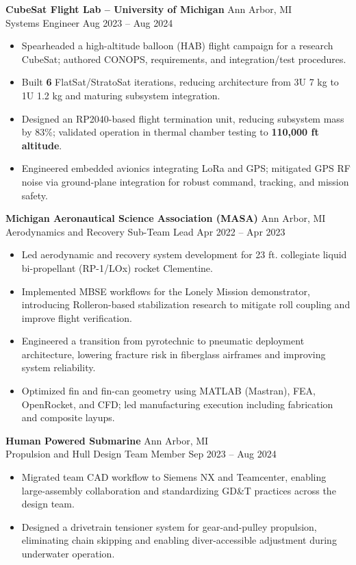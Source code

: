 \documentclass[10pt]{article}
\begin{document}
{\bfseries CubeSat Flight Lab -- University of Michigan} \hfill Ann Arbor, MI \\
Systems Engineer \hfill Aug 2023 -- Aug 2024
\begin{itemize}
  \item Spearheaded a high-altitude balloon (HAB) flight campaign for a research CubeSat; authored CONOPS, requirements, and integration/test procedures.
  \item Built {\bfseries 6} FlatSat/StratoSat iterations, reducing architecture from 3U 7 kg to 1U 1.2 kg and maturing subsystem integration.
  \item Designed an RP2040-based flight termination unit, reducing subsystem mass by 83\%; validated operation in thermal chamber testing to {\bfseries 110,000 ft altitude}.
  \item Engineered embedded avionics integrating LoRa and GPS; mitigated GPS RF noise via ground-plane integration for robust command, tracking, and mission safety.
\end{itemize}

{\bfseries Michigan Aeronautical Science Association (MASA)} \hfill Ann Arbor, MI \\
Aerodynamics and Recovery Sub-Team Lead \hfill Apr 2022 -- Apr 2023
\begin{itemize}
  \item Led aerodynamic and recovery system development for 23 ft. collegiate liquid bi-propellant (RP-1/LOx) rocket Clementine.
  \item Implemented MBSE workflows for the Lonely Mission demonstrator, introducing Rolleron-based stabilization research to mitigate roll coupling and improve flight verification.
  \item Engineered a transition from pyrotechnic to pneumatic deployment architecture, lowering fracture risk in fiberglass airframes and improving system reliability.
  \item Optimized fin and fin-can geometry using MATLAB (Mastran), FEA, OpenRocket, and CFD; led manufacturing execution including fabrication and composite layups.
\end{itemize}

{\bfseries Human Powered Submarine} \hfill Ann Arbor, MI \\
Propulsion and Hull Design Team Member \hfill Sep 2023 -- Aug 2024
\begin{itemize}
  \item Migrated team CAD workflow to Siemens NX and Teamcenter, enabling large-assembly collaboration and standardizing GD\&T practices across the design team.
  \item Designed a drivetrain tensioner system for gear-and-pulley propulsion, eliminating chain skipping and enabling diver-accessible adjustment during underwater operation.
\end{itemize}
\end{document}
